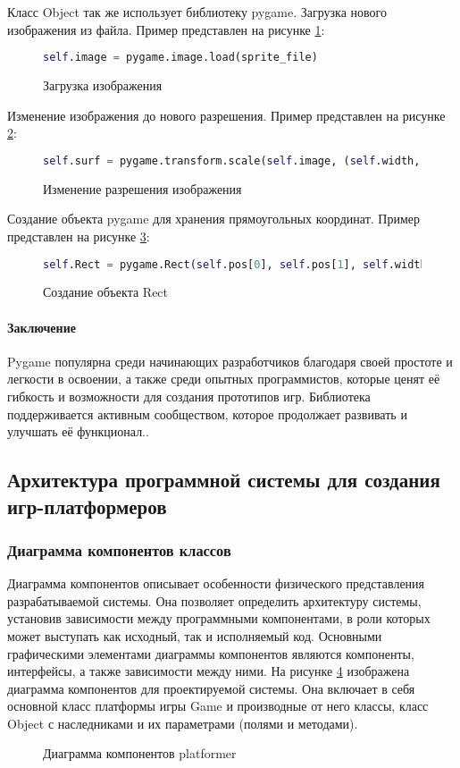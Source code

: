 Класс Object так же использует библиотеку pygame. 
Загрузка нового изображения из файла.
Пример представлен на рисунке \ref{imageload:image}:
\begin{figure}[H]
	\begin{lstlisting}[language=Python]
		self.image = pygame.image.load(sprite_file)
	\end{lstlisting}  
	\caption{Загрузка изображения}
	\label{imageload:image}
\end{figure}	
Изменение изображения до нового разрешения.
Пример представлен на рисунке \ref{transform:image}:
\begin{figure}[H]
	\begin{lstlisting}[language=Python]
		self.surf = pygame.transform.scale(self.image, (self.width, self.height))
	\end{lstlisting}  
	\caption{Изменение разрешения изображения}
	\label{transform:image}
\end{figure}	
Создание объекта pygame для хранения прямоугольных координат.
Пример представлен на рисунке \ref{rect:image}:
\begin{figure}[H]
	\begin{lstlisting}[language=Python]
		self.Rect = pygame.Rect(self.pos[0], self.pos[1], self.width, self.height)
	\end{lstlisting}  
	\caption{Создание объекта Rect}
	\label{rect:image}
\end{figure}	
					
\paragraph{Заключение}
Pygame популярна среди начинающих разработчиков благодаря своей простоте и легкости в освоении, а также среди опытных программистов, которые ценят её гибкость и возможности для создания прототипов игр. Библиотека поддерживается активным сообществом, которое продолжает развивать и улучшать её функционал..

\subsection{Архитектура программной системы для создания игр-платформеров}
\subsubsection{Диаграмма компонентов классов}
Диаграмма компонентов описывает особенности физического представления разрабатываемой системы. Она позволяет определить архитектуру системы, установив зависимости между программными компонентами, в роли которых может выступать как исходный, так и исполняемый код. Основными графическими элементами диаграммы компонентов являются компоненты, интерфейсы, а также зависимости между ними. На рисунке \ref{platformer:image} изображена диаграмма компонентов для проектируемой системы. Она включает в себя основной класс платформы игры Game и производные от него классы, класс Object с наследниками и их параметрами (полями и методами).
\begin{figure}[ht]
	\caption{Диаграмма компонентов platformer}
	\label{platformer:image}
\end{figure}
